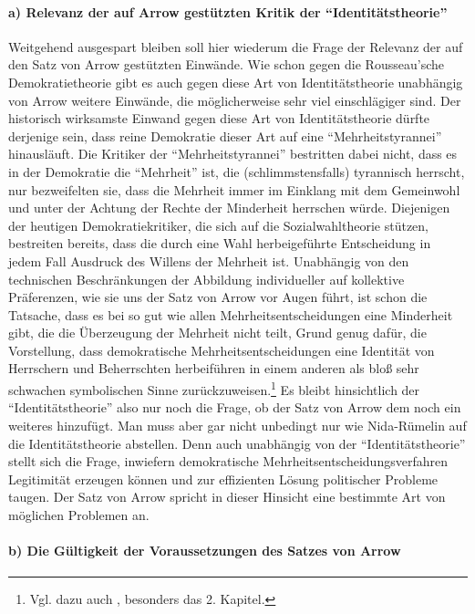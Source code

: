 \paragraph{a) Relevanz der auf Arrow gestützten Kritik der "`Identitätstheorie"'}
Weitgehend ausgespart bleiben soll hier wiederum die Frage der Relevanz der auf
den Satz von Arrow gestützten Einwände. Wie schon gegen die Rousseau'sche
Demokratietheorie gibt es auch gegen diese Art von Identitätstheorie unabhängig
von Arrow weitere Einwände, die möglicherweise sehr viel einschlägiger sind. Der
historisch wirksamste Einwand gegen diese Art von Identitätstheorie dürfte
derjenige sein, dass reine Demokratie dieser Art auf eine "`Mehrheitstyrannei"'
hinausläuft. Die Kritiker der "`Mehrheitstyrannei"' bestritten dabei nicht, dass
es in der Demokratie die "`Mehrheit"' ist, die (schlimmstensfalls) tyrannisch
herrscht, nur bezweifelten sie, dass die Mehrheit immer im Einklang mit dem
Gemeinwohl und unter der Achtung der Rechte der Minderheit herrschen würde.
Diejenigen der heutigen Demokratiekritiker, die sich auf die Sozialwahltheorie
stützen, bestreiten bereits, dass die durch eine Wahl herbeigeführte Entscheidung
in jedem Fall Ausdruck des Willens der Mehrheit ist. Unabhängig von den
technischen Beschränkungen der Abbildung individueller auf kollektive
Präferenzen, wie sie uns der Satz von Arrow vor Augen führt, ist schon die
Tatsache, dass es bei so gut wie allen Mehrheitsentscheidungen eine Minderheit
gibt, die die Überzeugung der Mehrheit nicht teilt, Grund genug dafür, die
Vorstellung, dass demokratische Mehrheitsentscheidungen eine Identität von
Herrschern und Beherrschten herbeiführen in einem anderen als bloß sehr schwachen
symbolischen Sinne zurückzuweisen.\footnote{Vgl. dazu auch \cite{sartori:1987},
besonders das 2. Kapitel.} Es bleibt hinsichtlich der "`Identitätstheorie"' also
nur noch die Frage, ob der Satz von Arrow dem noch ein weiteres hinzufügt. Man
muss aber gar nicht unbedingt nur wie Nida-Rümelin auf die Identitätstheorie
abstellen. Denn auch unabhängig von der "`Identitätstheorie"' stellt sich die
Frage, inwiefern demokratische Mehrheitsentscheidungsverfahren Legitimität
erzeugen können und zur effizienten Lösung politischer Probleme taugen. Der Satz
von Arrow spricht in dieser Hinsicht eine bestimmte Art von möglichen Problemen
an.
  
\paragraph{b) Die Gültigkeit der Voraussetzungen des Satzes von Arrow}

